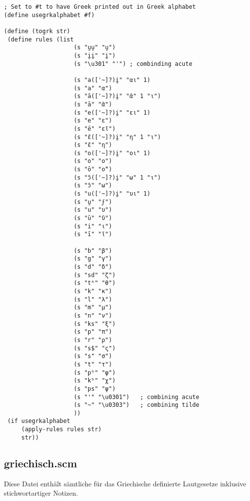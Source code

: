\begin{verbatim}
; Set to #t to have Greek printed out in Greek alphabet
(define usegrkalphabet #f)

(define (togrk str)
 (define rules (list
                    (s "u̯u̯" "u̯")
                    (s "i̯i̯" "i̯")
                    (s "\u301" "'")	; combinding acute

                    (s "a(['~]?)i̯" "αι" 1)
                    (s "a" "α")
                    (s "ā(['~]?)i̯" "ᾱ" 1 "ι")
                    (s "ā" "ᾱ")
                    (s "e(['~]?)i̯" "ει" 1)
                    (s "e" "ε")
                    (s "ē" "ε̄ι")
                    (s "ɛ̄(['~]?)i̯" "η" 1 "ι")
                    (s "ɛ̄" "η")
                    (s "o(['~]?)i̯" "οι" 1)
                    (s "o" "ο")
                    (s "ō" "ο̄")
                    (s "ɔ̄(['~]?)i̯" "ω" 1 "ι")
                    (s "ɔ̄" "ω")
                    (s "u(['~]?)i̯" "υι" 1)
                    (s "u̯" "ϝ")
                    (s "u" "υ")
                    (s "ū" "ῡ")
                    (s "i" "ι")
                    (s "ī" "ῑ")

                    (s "b" "β")
                    (s "g" "γ")
                    (s "d" "δ")
                    (s "sd" "ζ")
                    (s "tʰ" "θ")
                    (s "k" "κ")
                    (s "l" "λ")
                    (s "m" "μ")
                    (s "n" "ν")
                    (s "ks" "ξ")
                    (s "p" "π")
                    (s "r" "ρ")
                    (s "s$" "ς")
                    (s "s" "σ")
                    (s "t" "τ")
                    (s "pʰ" "φ")
                    (s "kʰ" "χ")
                    (s "ps" "ψ")
                    (s "'" "\u0301")   ; combining acute
                    (s "~" "\u0303")   ; combining tilde
                    ))
 (if usegrkalphabet
     (apply-rules rules str)
     str))

\end{verbatim}

\subsection{griechisch.scm}
Diese Datei enthält sämtliche für das Griechische definierte Lautgesetze
inklusive stichwortartiger Notizen.

